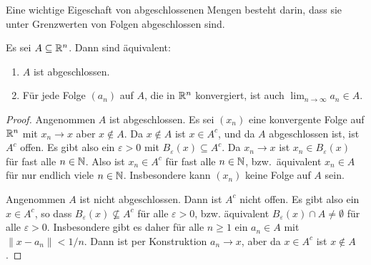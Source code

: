 \documentclass[a4paper,10pt]{article}
\begin{document}
Eine wichtige Eigeschaft von abgeschlossenen Mengen besteht darin, dass sie unter Grenzwerten von Folgen abgeschlossen sind.


\begin{lem}
 Es sei $A \subseteq \mathbb{R}^n$. Dann sind äquivalent:
 \begin{enumerate}
  \item
   $A$ ist abgeschlossen.
  \item
   Für jede Folge $(a_n)$ auf $A$, die in $\mathbb{R}^n$ konvergiert, ist auch $\lim_{n \to \infty} a_n \in A$.
 \end{enumerate}
\end{lem}
\begin{proof}
 Angenommen $A$ ist abgeschlossen. Es sei $(x_n)$ eine konvergente Folge auf $\mathbb{R}^n$ mit $x_n \to x$ aber $x \notin A$. Da $x \notin A$ ist $x \in A^c$, und da $A$ abgeschlossen ist, ist $A^c$ offen. Es gibt also ein $\varepsilon > 0$ mit $B_\varepsilon(x) \subseteq A^c$. Da $x_n \to x$ ist $x_n \in B_\varepsilon(x)$ für fast alle $n \in \mathbb{N}$. Also ist $x_n \in A^c$ für fast alle $n \in \mathbb{N}$, bzw.\ äquivalent $x_n \in A$ für nur endlich viele $n \in \mathbb{N}$. Insbesondere kann $(x_n)$ keine Folge auf $A$ sein.
 
 Angenommen $A$ ist nicht abgeschlossen. Dann ist $A^c$ nicht offen. Es gibt also ein $x \in A^c$, so dass $B_\varepsilon(x) \nsubseteq A^c$ für alle $\varepsilon > 0$, bzw. äquivalent $B_\varepsilon(x) \cap A \neq \emptyset$ für alle $\varepsilon > 0$. Insbesondere gibt es daher für alle $n \geq 1$ ein $a_n \in A$ mit $\|x-a_n\| < 1/n$. Dann ist per Konstruktion $a_n \to x$, aber da $x \in A^c$ ist $x \notin A$.
\end{proof}
\end{document}
